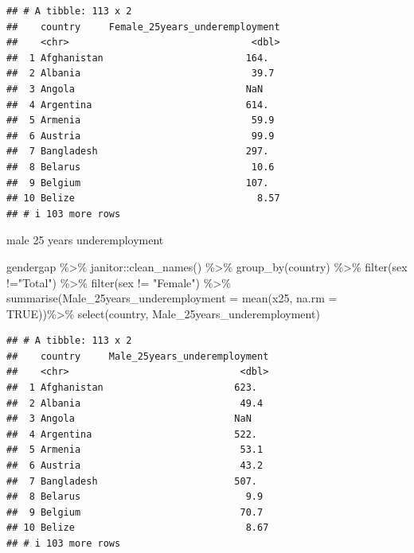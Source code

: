 \documentclass[
]{article}
\newenvironment{Shaded}{\begin{snugshade}}{\end{snugshade}}
\newcommand{\AttributeTok}[1]{\textcolor[rgb]{0.77,0.63,0.00}{#1}}
\newcommand{\ConstantTok}[1]{\textcolor[rgb]{0.00,0.00,0.00}{#1}}
\newcommand{\FunctionTok}[1]{\textcolor[rgb]{0.00,0.00,0.00}{#1}}
\newcommand{\NormalTok}[1]{#1}
\newcommand{\SpecialCharTok}[1]{\textcolor[rgb]{0.00,0.00,0.00}{#1}}
\newcommand{\StringTok}[1]{\textcolor[rgb]{0.31,0.60,0.02}{#1}}
\begin{document}
\begin{verbatim}
## # A tibble: 113 x 2
##    country     Female_25years_underemployment
##    <chr>                                <dbl>
##  1 Afghanistan                         164.  
##  2 Albania                              39.7 
##  3 Angola                              NaN   
##  4 Argentina                           614.  
##  5 Armenia                              59.9 
##  6 Austria                              99.9 
##  7 Bangladesh                          297.  
##  8 Belarus                              10.6 
##  9 Belgium                             107.  
## 10 Belize                                8.57
## # i 103 more rows
\end{verbatim}

male 25 years underemployment

\begin{Shaded}
\begin{Highlighting}[]
\NormalTok{gendergap }\SpecialCharTok{\%\textgreater{}\%}
\NormalTok{  janitor}\SpecialCharTok{::}\FunctionTok{clean\_names}\NormalTok{() }\SpecialCharTok{\%\textgreater{}\%}
  \FunctionTok{group\_by}\NormalTok{(country) }\SpecialCharTok{\%\textgreater{}\%}
  \FunctionTok{filter}\NormalTok{(sex }\SpecialCharTok{!=}\StringTok{"Total"}\NormalTok{) }\SpecialCharTok{\%\textgreater{}\%}
  \FunctionTok{filter}\NormalTok{(sex }\SpecialCharTok{!=} \StringTok{"Female"}\NormalTok{) }\SpecialCharTok{\%\textgreater{}\%}
  \FunctionTok{summarise}\NormalTok{(}\AttributeTok{Male\_25years\_underemployment =} \FunctionTok{mean}\NormalTok{(x25, }\AttributeTok{na.rm =} \ConstantTok{TRUE}\NormalTok{))}\SpecialCharTok{\%\textgreater{}\%}
  \FunctionTok{select}\NormalTok{(country, Male\_25years\_underemployment)}
\end{Highlighting}
\end{Shaded}

\begin{verbatim}
## # A tibble: 113 x 2
##    country     Male_25years_underemployment
##    <chr>                              <dbl>
##  1 Afghanistan                       623.  
##  2 Albania                            49.4 
##  3 Angola                            NaN   
##  4 Argentina                         522.  
##  5 Armenia                            53.1 
##  6 Austria                            43.2 
##  7 Bangladesh                        507.  
##  8 Belarus                             9.9 
##  9 Belgium                            70.7 
## 10 Belize                              8.67
## # i 103 more rows
\end{verbatim}
\end{document}

